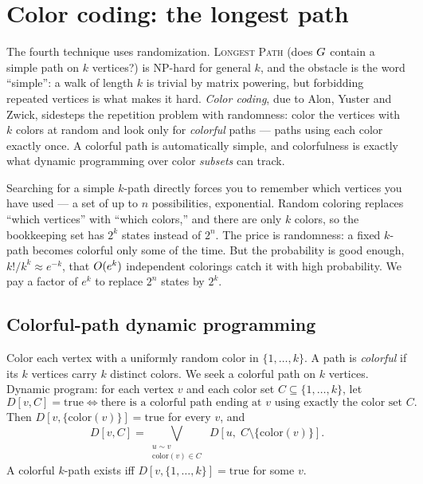 \section{Color coding: the longest path}

The fourth technique uses randomization. \textsc{Longest Path} (does $G$ contain a simple path on $k$ vertices?) is NP-hard for general $k$, and the obstacle is the word ``simple'': a walk of length $k$ is trivial by matrix powering, but forbidding repeated vertices is what makes it hard. \emph{Color coding}, due to Alon, Yuster and Zwick, sidesteps the repetition problem with randomness: color the vertices with $k$ colors at random and look only for \emph{colorful} paths --- paths using each color exactly once. A colorful path is automatically simple, and colorfulness is exactly what dynamic programming over color \emph{subsets} can track.

\begin{intuitionbox}
Searching for a simple $k$-path directly forces you to remember which vertices you have used --- a set of up to $n$ possibilities, exponential. Random coloring replaces ``which vertices'' with ``which colors,'' and there are only $k$ colors, so the bookkeeping set has $2^k$ states instead of $2^n$. The price is randomness: a fixed $k$-path becomes colorful only some of the time. But the probability is good enough, $k!/k^k\approx e^{-k}$, that $O(e^k)$ independent colorings catch it with high probability. We pay a factor of $e^k$ to replace $2^n$ states by $2^k$.
\end{intuitionbox}

\subsection{Colorful-path dynamic programming}

Color each vertex with a uniformly random color in $\{1,\dots,k\}$. A path is \emph{colorful} if its $k$ vertices carry $k$ distinct colors. We seek a colorful path on $k$ vertices. Dynamic program: for each vertex $v$ and each color set $C\subseteq\{1,\dots,k\}$, let
\[
  D[v,C] = \text{true} \iff \text{there is a colorful path ending at }v\text{ using exactly the color set }C.
\]
Then $D[v,\{\mathrm{color}(v)\}]=\text{true}$ for every $v$, and
\[
  D[v,C] = \bigvee_{\substack{u\sim v\\ \mathrm{color}(v)\in C}}\; D[u,\; C\setminus\{\mathrm{color}(v)\}].
\]
A colorful $k$-path exists iff $D[v,\{1,\dots,k\}]=\text{true}$ for some $v$.

